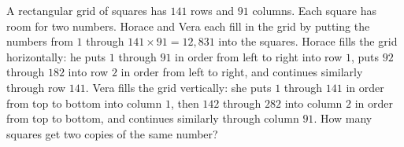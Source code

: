A rectangular grid of squares has $141$ rows and $91$ columns. Each square has room for two numbers. Horace and Vera each fill in the grid by putting the numbers from $1$ through $141 \times 91 = 12{,}831$ into the squares. Horace fills the grid horizontally: he puts $1$ through $91$ in order from left to right into row $1$, puts $92$ through $182$ into row $2$ in order from left to right, and continues similarly through row $141$. Vera fills the grid vertically: she puts $1$ through $141$ in order from top to bottom into column $1$, then $142$ through $282$ into column $2$ in order from top to bottom, and continues similarly through column $91$. How many squares get two copies of the same number?
